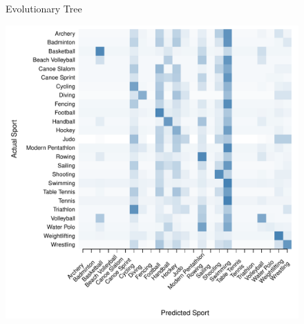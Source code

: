 \begin{figure}
\begin{center}
\begin{minipage}{0.20\textwidth}
\begin{center}
    \end{center}
  \end{minipage}



    Evolutionary Tree \\

  \begin{minipage}{0.20\textwidth}
    \begin{center}
      \includegraphics[scale=0.20]{../graphics/sportEV-trn.pdf}
    \end{center}
  \end{minipage}
  \hspace{0.05\textwidth}
  \begin{minipage}{0.20\textwidth}
    \begin{center}

\end{center}
\end{minipage}
\end{center}
\end{figure}
